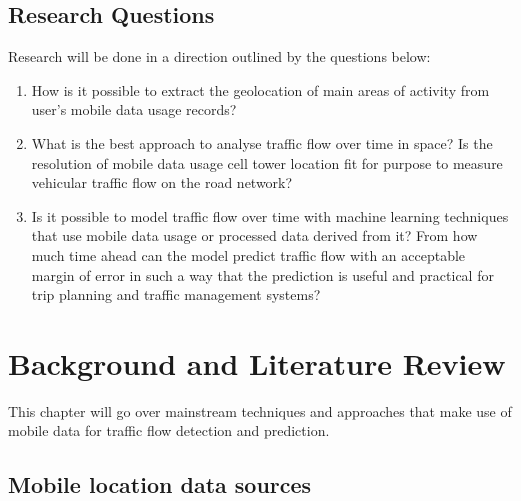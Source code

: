 \documentclass[12pt, a4paper]{report}
\theoremstyle{definition}
\theoremstyle{definition}%
\theoremstyle{definition}%
\theoremstyle{definition}%
\theoremstyle{definition}%
\theoremstyle{definition}%
\begin{document}
\section{Research Questions}

Research will be done in a direction outlined by the questions below:
\begin{enumerate}
	\item How is it possible to extract the geolocation of main areas of activity from user's mobile data usage records?
	\item What is the best approach to analyse traffic flow over time in space? Is the resolution of mobile data usage cell tower location fit for purpose to measure vehicular traffic flow on the road network?
	\item Is it possible to model traffic flow over time with machine learning techniques that use mobile data usage or processed data derived from it? From how much time ahead can the model predict traffic flow with an acceptable margin of error in such a way that the prediction is useful and practical for trip planning and traffic management systems?
\end{enumerate}



\chapter{Background and Literature Review} \label{background}

This chapter will go over mainstream techniques and approaches that make use of mobile data for traffic flow detection and prediction.

\section{Mobile location data sources} \label{background_mobile_location_data_sources} 
\end{document}
